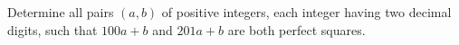 Determine all pairs $ (a,b)$ of positive integers, each integer having two decimal digits, such that $ 100a+b$ and $ 201a+b$ are both perfect squares.